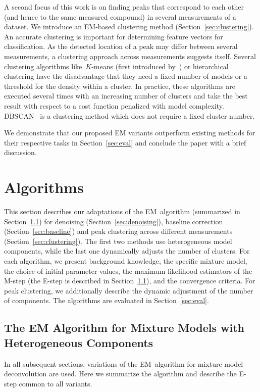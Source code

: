 \documentclass{article}
\begin{document}
A second focus of this work is on finding peaks that correspond to each other (and hence to the same measured compound) in several measurements of a dataset.
We introduce an EM-based clustering method (Section~\ref{sec:clustering}).
An accurate clustering is important for determining feature vectors for classification.
As the detected location of a peak may differ between several measurements, a clustering approach across measurements suggests itself.
Several clustering algorithms like~$K$-means (first introduced by~\cite{macqueen1967kmeans}) or hierarchical clustering have the disadvantage that they need a fixed number of models or a threshold for the density within a cluster.
In practice, these algorithms are executed several times with an increasing number of clusters and take the best result with respect to a cost function penalized with model complexity.
DBSCAN~\citep{ester/etal/1996} is a clustering method which does not require a fixed cluster number.

We demonstrate that our proposed EM variants outperform existing methods for their respective tasks in Section~\ref{sec:eval} and conclude the paper with a brief discussion.
\section{Algorithms}
\label{sec:algo}

This section describes our adaptations of the EM~algorithm (summarized in Section~\ref{sec:algo:em}) for denoising (Section~\ref{sec:denoising}), baseline correction (Section~\ref{sec:baseline}) and peak clustering across different measurements (Section~\ref{sec:clustering}).
The first two methods use heterogeneous model components, while the last one dynamically adjusts the number of clusters.
For each algorithm, we present background knowledge, the specific mixture model, the choice of initial parameter values, the maximum likelihood estimators of the M-step (the E-step is described in Section~\ref{sec:algo:em}), and the convergence criteria.
For peak clustering, we additionally describe the dynamic adjustment of the number of components.
The algorithms are evaluated in Section~\ref{sec:eval}.

\subsection{The EM Algorithm for Mixture Models with Heterogeneous Components}
\label{sec:algo:em}

In all subsequent sections, variations of the EM~algorithm \citep{Dempster/etal/1977a} for mixture model deconvolution are used.
Here we summarize the algorithm and describe the E-step common to all variants.
\end{document}
